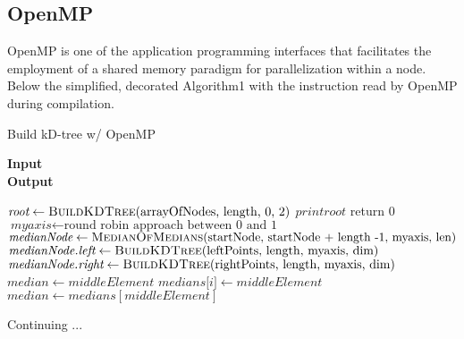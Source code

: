 \documentclass[11pt]{article}
\begin{document}
\subsection{OpenMP}
OpenMP is one of the application programming interfaces that facilitates the employment of a shared memory paradigm for parallelization within a node.
Below the simplified, decorated Algorithm1 with the instruction read by OpenMP during compilation.
\begin{algorithm}[H]
\caption{Build kD-tree w/ OpenMP}
\hspace*{\algorithmicindent} \textbf{Input}  \\
\hspace*{\algorithmicindent} \textbf{Output} 
\begin{algorithmic}[1]
\color{blue}
\color{black}
\State $\textit{root} \gets \Call{BuildKDTree}{$arrayOfNodes, length, 0, 2$}$
\color{blue}
\color{black}
\State $print \textit{root}$
\EndFunction
{}
\Statex
{}
\State return 0
\EndIf
\Statex
\State $\textit{myaxis} \gets \text{round robin approach between 0 and 1}$
\Statex
\State $\textit{medianNode} \gets \Call{MedianOfMedians}{$startNode, startNode + length -1, myaxis, len$}$
\Statex
\color{blue}
\color{black}
\State $\textit{medianNode.left} \gets \Call{BuildKDTree}{$leftPoints, length, myaxis, dim$}$
\color{blue}
\color{black}
\State $\textit{medianNode.right} \gets \Call{BuildKDTree}{$rightPoints, length, myaxis, dim$}$
\State \Return {}
\EndFunction
\Statex
{}
\State {}
\State $\textit{median} \gets middleElement$
\Else
{}
\color{blue}
\color{black}
\State {}
\State $\textit{medians[i]} \gets middleElement$
\EndFor
\Statex
\State $\textit{median} \gets medians[middleElement]$
\EndIf
\State \Return {}
\EndFunction
\Statex
{}
\end{algorithmic}
\end{algorithm}
Continuing ... 
\begin{algorithm}[h]
\begin{algorithmic}[1]
\State {}
\EndProcedure
\end{algorithmic}
\end{algorithm}
\end{document}
